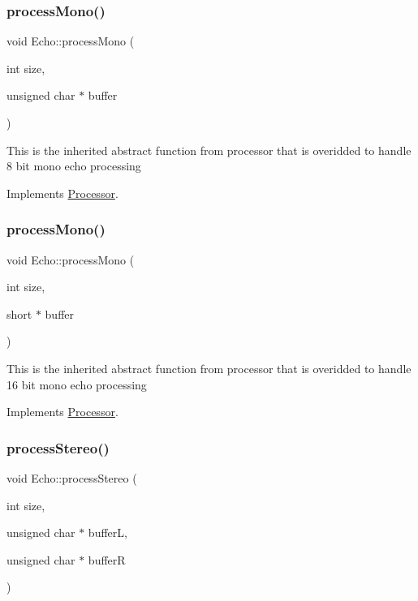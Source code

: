 \subsubsection{\texorpdfstring{process\+Mono()}{processMono()}\hspace{0.1cm}{\footnotesize\ttfamily [1/2]}}
{\footnotesize\ttfamily void Echo\+::process\+Mono (\begin{DoxyParamCaption}\item[{int}]{size,  }\item[{unsigned char $\ast$}]{buffer }\end{DoxyParamCaption})\hspace{0.3cm}{\ttfamily [virtual]}}

This is the inherited abstract function from processor that is overidded to handle 8 bit mono echo processing 

Implements \hyperlink{classProcessor_aae6af1473510f56839f3e15328962fb0}{Processor}.

\mbox{\label{classEcho_af5155cf6165be0317de49e4498268062}} 
\subsubsection{\texorpdfstring{process\+Mono()}{processMono()}\hspace{0.1cm}{\footnotesize\ttfamily [2/2]}}
{\footnotesize\ttfamily void Echo\+::process\+Mono (\begin{DoxyParamCaption}\item[{int}]{size,  }\item[{short $\ast$}]{buffer }\end{DoxyParamCaption})\hspace{0.3cm}{\ttfamily [virtual]}}

This is the inherited abstract function from processor that is overidded to handle 16 bit mono echo processing 

Implements \hyperlink{classProcessor_ab24fa87b5eb6246cf8599756b3b5862d}{Processor}.

\mbox{\label{classEcho_adadbb432a61bd1e2036f0690bfe0b1a0}} 
\subsubsection{\texorpdfstring{process\+Stereo()}{processStereo()}\hspace{0.1cm}{\footnotesize\ttfamily [1/2]}}
{\footnotesize\ttfamily void Echo\+::process\+Stereo (\begin{DoxyParamCaption}\item[{int}]{size,  }\item[{unsigned char $\ast$}]{bufferL,  }\item[{unsigned char $\ast$}]{bufferR }\end{DoxyParamCaption})\hspace{0.3cm}{\ttfamily [virtual]}}

